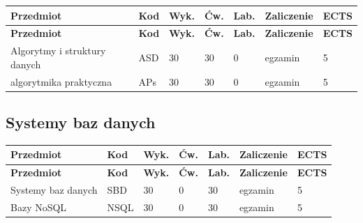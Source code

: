 \documentclass[12pt,a4paper]{article}
\newcommand{\thdrule}{\noalign{\global\setlength{\extrarowheight}{0pt}}}
\newcommand{\thdend}{\noalign{\global\setlength{\extrarowheight}{4pt}}}
\begin{document}
{\scriptsize
\begin{longtable}{m{5.5cm}m{0.8cm}m{1cm}m{1cm}m{1cm}m{1.7cm}m{0.7cm}}
\thdrule\toprule
\rowcolor{pjatkRed}
{\color{white}\footnotesize\textbf{\vphantom{Ag}Przedmiot}} & {\color{white}\footnotesize\textbf{\vphantom{Ag}Kod}} & {\color{white}\footnotesize\textbf{\vphantom{Ag}Wyk.}} & {\color{white}\footnotesize\textbf{\vphantom{Ag}Ćw.}} & {\color{white}\footnotesize\textbf{\vphantom{Ag}Lab.}} & {\color{white}\footnotesize\textbf{\vphantom{Ag}Zaliczenie}} & {\color{white}\footnotesize\textbf{\vphantom{Ag}ECTS}} \\
\midrule\thdend
\endfirsthead
\thdrule\toprule
\rowcolor{pjatkRed}
{\color{white}\footnotesize\textbf{\vphantom{Ag}Przedmiot}} & {\color{white}\footnotesize\textbf{\vphantom{Ag}Kod}} & {\color{white}\footnotesize\textbf{\vphantom{Ag}Wyk.}} & {\color{white}\footnotesize\textbf{\vphantom{Ag}Ćw.}} & {\color{white}\footnotesize\textbf{\vphantom{Ag}Lab.}} & {\color{white}\footnotesize\textbf{\vphantom{Ag}Zaliczenie}} & {\color{white}\footnotesize\textbf{\vphantom{Ag}ECTS}} \\
\midrule\thdend
\endhead
\rowcolor{tableRowLight} Algorytmy i struktury danych & ASD & 30 & 30 & 0 & {\scriptsize egzamin} & 5 \\
\rowcolor{tableRowAlt} algorytmika praktyczna & APs & 30 & 30 & 0 & {\scriptsize egzamin} & 5 \\
\bottomrule
\end{longtable}}

\subsection*{Systemy baz danych}

{\scriptsize
\begin{longtable}{m{5.5cm}m{0.8cm}m{1cm}m{1cm}m{1cm}m{1.7cm}m{0.7cm}}
\thdrule\toprule
\rowcolor{pjatkRed}
{\color{white}\footnotesize\textbf{\vphantom{Ag}Przedmiot}} & {\color{white}\footnotesize\textbf{\vphantom{Ag}Kod}} & {\color{white}\footnotesize\textbf{\vphantom{Ag}Wyk.}} & {\color{white}\footnotesize\textbf{\vphantom{Ag}Ćw.}} & {\color{white}\footnotesize\textbf{\vphantom{Ag}Lab.}} & {\color{white}\footnotesize\textbf{\vphantom{Ag}Zaliczenie}} & {\color{white}\footnotesize\textbf{\vphantom{Ag}ECTS}} \\
\midrule\thdend
\endfirsthead
\thdrule\toprule
\rowcolor{pjatkRed}
{\color{white}\footnotesize\textbf{\vphantom{Ag}Przedmiot}} & {\color{white}\footnotesize\textbf{\vphantom{Ag}Kod}} & {\color{white}\footnotesize\textbf{\vphantom{Ag}Wyk.}} & {\color{white}\footnotesize\textbf{\vphantom{Ag}Ćw.}} & {\color{white}\footnotesize\textbf{\vphantom{Ag}Lab.}} & {\color{white}\footnotesize\textbf{\vphantom{Ag}Zaliczenie}} & {\color{white}\footnotesize\textbf{\vphantom{Ag}ECTS}} \\
\midrule\thdend
\endhead
\rowcolor{tableRowLight} Systemy baz danych & SBD & 30 & 0 & 30 & {\scriptsize egzamin} & 5 \\
\rowcolor{tableRowAlt} Bazy NoSQL & NSQL & 30 & 0 & 30 & {\scriptsize egzamin} & 5 \\
\bottomrule
\end{longtable}}
\end{document}
